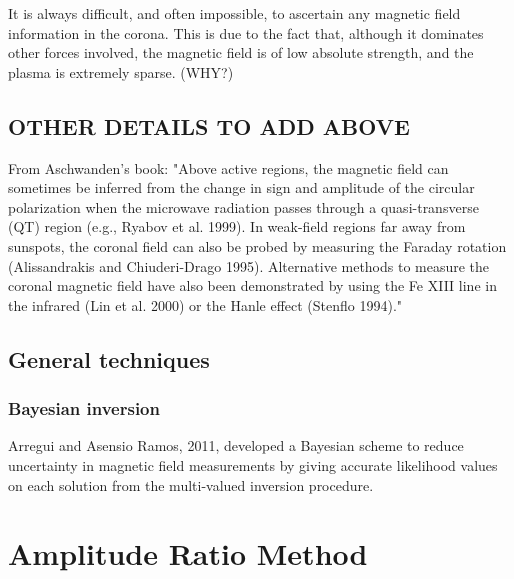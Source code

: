 \documentclass[12pt]{../style-files/ociamthesis}
\begin{document}
It is always difficult, and often impossible, to ascertain any magnetic field information in the corona. This is due to the fact that, although it dominates other forces involved, the magnetic field is of low absolute strength, and the plasma is extremely sparse. (WHY?)


\subsection{OTHER DETAILS TO ADD ABOVE}
From Aschwanden's book: "Above active regions, the magnetic field can sometimes be inferred from the change in sign and amplitude of the circular polarization when the microwave radiation passes through a quasi-transverse (QT) region (e.g., Ryabov et al. 1999). In weak-field regions far away from sunspots, the coronal field can also be probed by measuring the Faraday rotation (Alissandrakis  and Chiuderi-Drago 1995). Alternative methods to measure the coronal magnetic field have also been demonstrated by using the Fe XIII line in the infrared (Lin et al. 2000) or the Hanle effect (Stenflo 1994)."


\subsection{General techniques}
\subsubsection{Bayesian inversion}
Arregui and Asensio Ramos, 2011, developed a Bayesian scheme to reduce uncertainty in magnetic field measurements by giving accurate likelihood values on each solution from the multi-valued inversion procedure.










\section{Amplitude Ratio Method}
\label{sec: ARM}
\end{document}
